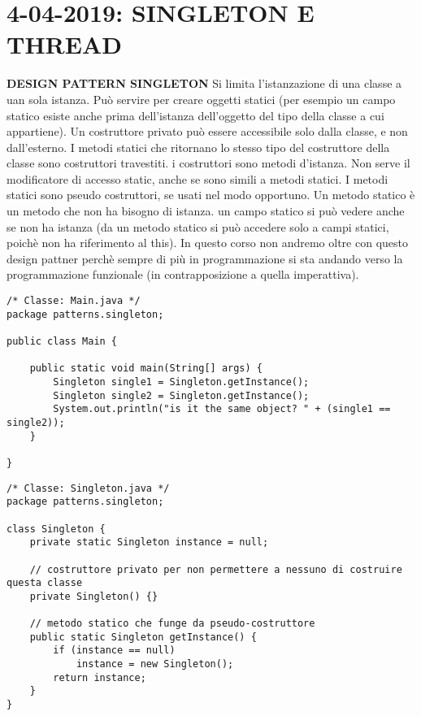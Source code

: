 

\newpage
\section{4-04-2019: SINGLETON E THREAD}
\textbf{DESIGN PATTERN SINGLETON} \newline
Si limita l'istanzazione di una classe a uan sola istanza. \newline
Può servire per creare oggetti statici (per esempio un campo statico esiste anche prima dell'istanza dell'oggetto del tipo della classe a cui appartiene). \newline
Un costruttore privato può essere accessibile solo dalla classe, e non dall'esterno. \newline
I metodi statici che ritornano lo stesso tipo del costruttore della classe sono costruttori travestiti. \newline
i costruttori sono metodi d'istanza. Non serve il modificatore di accesso static, anche se sono simili a metodi statici. \newline
I metodi statici sono pseudo costruttori, se usati nel modo opportuno. \newline
Un metodo statico è un metodo che non ha bisogno di istanza. un campo statico si può vedere anche se non ha istanza (da un metodo statico si può accedere solo a campi statici, poichè non ha riferimento al this). \newline
In questo corso non andremo oltre con questo design pattner perchè sempre di più in programmazione si sta andando verso la programmazione funzionale (in contrapposizione a quella imperattiva).


\begin{lstlisting}[basicstyle=\small,]
/* Classe: Main.java */
package patterns.singleton;

public class Main {

    public static void main(String[] args) {
        Singleton single1 = Singleton.getInstance();
        Singleton single2 = Singleton.getInstance();
        System.out.println("is it the same object? " + (single1 == single2));
    }

}

\end{lstlisting}

\begin{lstlisting}[basicstyle=\small,]
/* Classe: Singleton.java */
package patterns.singleton;

class Singleton {
    private static Singleton instance = null;

    // costruttore privato per non permettere a nessuno di costruire questa classe
    private Singleton() {}

    // metodo statico che funge da pseudo-costruttore
    public static Singleton getInstance() {
        if (instance == null)
            instance = new Singleton();
        return instance;
    }
}

\end{lstlisting}


